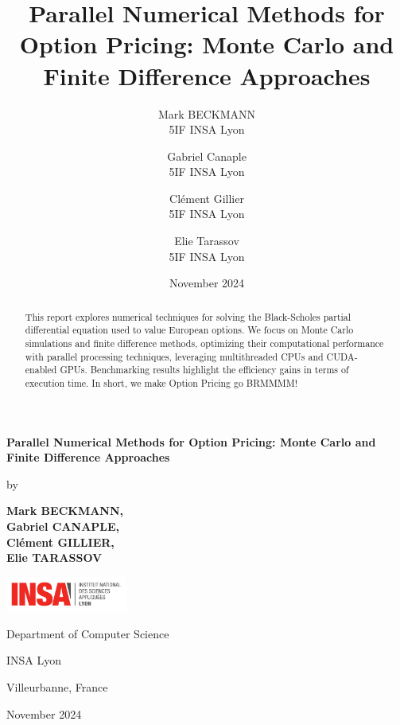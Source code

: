 \documentclass[12pt,a4paper]{report}
\title{\textbf{Parallel Numerical Methods for Option Pricing: Monte Carlo and Finite Difference Approaches}}
\author{
    Mark BECKMANN \\ 5IF INSA Lyon
    \and
    Gabriel Canaple \\ 5IF INSA Lyon
    \and
    Clément Gillier \\ 5IF INSA Lyon
    \and
    Elie Tarassov \\ 5IF INSA Lyon
}
\date{November 2024}
\newcommand{\thesistitle}{Parallel Numerical Methods for Option Pricing: Monte Carlo and Finite Difference Approaches}
\newcommand{\myname}{
    Mark BECKMANN, \\Gabriel CANAPLE, \\Clément GILLIER, \\Elie TARASSOV}
\newcommand{\thesisdate}{November 2024}
\begin{document}
\begin{titlepage}
    \centering
    \vspace*{4cm}
     {\huge \textbf{\thesistitle} \par}
      \vspace{2cm}
     {\large  by \par}
     \vspace{0.5cm}
     {\large \textbf{\myname} \par}
     \vspace{2cm}
    \includegraphics[width=0.3\textwidth]{insa.png}\par
    \vspace{1cm}
    {\large \sc Department of Computer Science \par}

     {\large \sc INSA Lyon  \par}

     {\large \sc Villeurbanne, France \par}
    \vspace{0.5cm}
    {\large \sc \thesisdate \par}
    \vspace{2cm}
   
\end{titlepage}





\begin{abstract}

This report explores numerical techniques for solving the Black-Scholes partial differential equation used to value European options. We focus on Monte Carlo simulations and finite difference methods, optimizing their computational performance with parallel processing techniques, leveraging multithreaded CPUs and CUDA-enabled GPUs. Benchmarking results highlight the efficiency gains in terms of execution time.
In short, we make Option Pricing go BRMMMM!
\end{abstract}
\newpage
\end{document}
